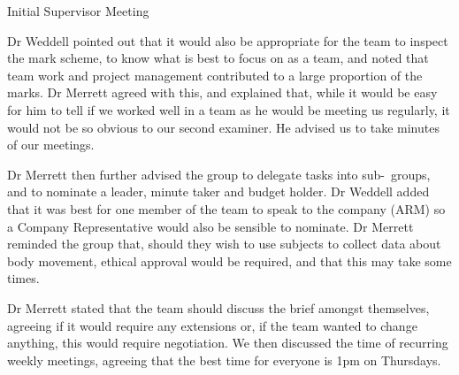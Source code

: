 \documentclass{article}
\begin{document}
\begin{Minutes}{Initial Supervisor Meeting}

Dr Weddell pointed out that it would also be appropriate for the team to
inspect the mark scheme, to know what is best to focus on as a team, and
noted that team work and project management contributed to a large
proportion of the marks. Dr Merrett agreed with this, and explained
that, while it would be easy for him to tell if we worked well in a team
as he would be meeting us regularly, it would not be so obvious to our
second examiner. He advised us to take minutes of our meetings.

Dr Merrett then further advised the group to delegate tasks into sub-\
groups, and to nominate a leader, minute taker and budget holder. Dr
Weddell added that it was best for one member of the team to speak to
the company (ARM) so a Company Representative would also be sensible to
nominate. Dr Merrett reminded the group that, should they wish to use
subjects to collect data about body movement, ethical approval would be
required, and that this may take some times.


Dr Merrett stated that the team should discuss the brief amongst
themselves, agreeing if it would require any extensions or, if the team
wanted to change anything, this would require negotiation. We then
discussed the time of recurring weekly meetings, agreeing that the best
time for everyone is 1pm on Thursdays.


\end{Minutes}
\end{document}
